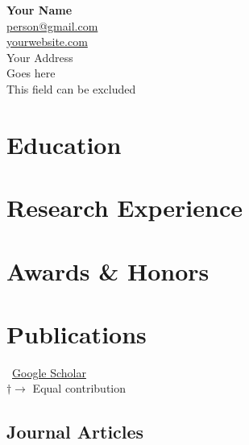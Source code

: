 \documentclass[11pt]{article} %
\newcommand{\mytitle}[4]{
  \begin{center}
    \Large\textbf{#1}\normalsize \\ %
    \href{mailto:#2}{#2} \\ %
    \href{https://#3}{#3} \\ %
    #4 %
  \end{center}
}
\begin{document}
\mytitle{Your Name}{person@gmail.com}{yourwebsite.com}{Your Address\\Goes here\\This field can be excluded} %


\RaggedRight


\section*{Education}


\section*{Research Experience}
\label{exp_research}


\section*{Awards \& Honors}
\label{awards}



\section*{Publications}
\label{pubs}

\vspace{-.75em}
\small
\faGoogle~\href{https://scholar.google.com/}{Google Scholar}\\
$\dagger \rightarrow$ Equal contribution
\normalsize


\subsection*{Journal Articles}
\label{journal-article}
\newrefcontext[labelprefix=J] %
\nocite{*} %
\printbibliography[
    type=article, %
    heading=none, %
    resetnumbers=true, %
    keyword=J %
]
\end{document}
